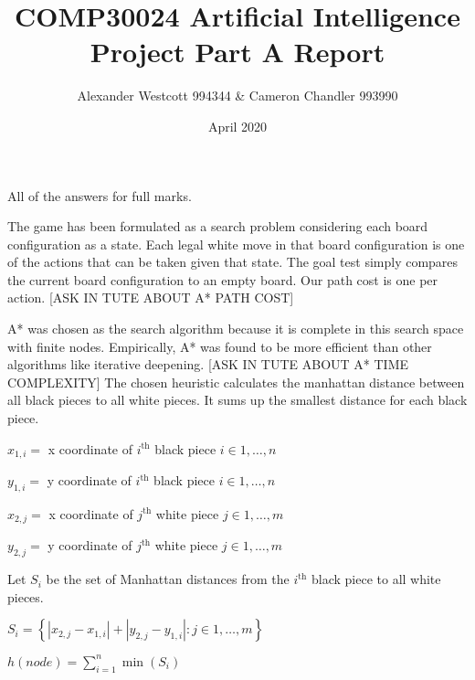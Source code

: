 \documentclass[a4paper,11pt]{article}
\author{Alexander Westcott 994344 \& Cameron Chandler 993990}
\title{COMP30024 Artificial Intelligence Project Part A Report}
\date{April 2020}
\begin{document}
\maketitle

All of the answers for full marks.\newline


The game has been formulated as a search problem considering each board configuration as a state. 
Each legal white move in that board configuration is one of the actions that can be taken given that state. 
The goal test simply compares the current board configuration to an empty board. Our path cost is one per action. 
[ASK IN TUTE ABOUT A* PATH COST]\newline



A* was chosen as the search algorithm because it is complete in this search space with finite nodes. 
Empirically, A* was found to be more efficient than other algorithms like iterative deepening. 
[ASK IN TUTE ABOUT A* TIME COMPLEXITY] 
The chosen heuristic calculates the manhattan distance between all black pieces to all white pieces. 
It sums up the smallest distance for each black piece.\newline



$x_{1,i} =$ x coordinate of $i^{\text{th}}$ black piece $i \in {1,\dots,n}$

$y_{1,i} =$ y coordinate of $i^{\text{th}}$ black piece $i \in {1,\dots,n}$

$x_{2,j} =$ x coordinate of $j^{\text{th}}$ white piece $j \in {1,\dots,m}$

$y_{2,j} =$ y coordinate of $j^{\text{th}}$ white piece $j \in {1,\dots,m}$

Let $S_i$ be the set of Manhattan distances from the $i^{\text{th}}$ black piece to all white pieces.

$S_i = \left\{\left| x_{2,j} - x_{1,i}\right| + \left| y_{2,j} - y_{1,i}\right| :j \in 1,\dots,m\right\}$

$h(node) = \displaystyle\sum_{i=1}^n{\min\left(S_i\right)}$
\end{document}
